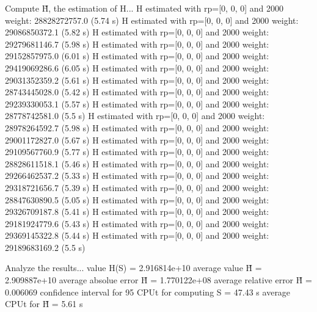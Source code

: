 Compute H̃, the estimation of H...
  H estimated with rp=[0, 0, 0] and 2000 weight:  28828272757.0  (5.74 s)
  H estimated with rp=[0, 0, 0] and 2000 weight:  29086850372.1  (5.82 s)
  H estimated with rp=[0, 0, 0] and 2000 weight:  29279681146.7  (5.98 s)
  H estimated with rp=[0, 0, 0] and 2000 weight:  29152857975.0  (6.01 s)
  H estimated with rp=[0, 0, 0] and 2000 weight:  29419069286.6  (6.05 s)
  H estimated with rp=[0, 0, 0] and 2000 weight:  29031352359.2  (5.61 s)
  H estimated with rp=[0, 0, 0] and 2000 weight:  28743445028.0  (5.42 s)
  H estimated with rp=[0, 0, 0] and 2000 weight:  29239330053.1  (5.57 s)
  H estimated with rp=[0, 0, 0] and 2000 weight:  28778742581.0  (5.5 s)
  H estimated with rp=[0, 0, 0] and 2000 weight:  28978264592.7  (5.98 s)
  H estimated with rp=[0, 0, 0] and 2000 weight:  29001172827.0  (5.67 s)
  H estimated with rp=[0, 0, 0] and 2000 weight:  29109567760.9  (5.77 s)
  H estimated with rp=[0, 0, 0] and 2000 weight:  28828611518.1  (5.46 s)
  H estimated with rp=[0, 0, 0] and 2000 weight:  29266462537.2  (5.33 s)
  H estimated with rp=[0, 0, 0] and 2000 weight:  29318721656.7  (5.39 s)
  H estimated with rp=[0, 0, 0] and 2000 weight:  28847630890.5  (5.05 s)
  H estimated with rp=[0, 0, 0] and 2000 weight:  29326709187.8  (5.41 s)
  H estimated with rp=[0, 0, 0] and 2000 weight:  29181924779.6  (5.43 s)
  H estimated with rp=[0, 0, 0] and 2000 weight:  29369145322.8  (5.44 s)
  H estimated with rp=[0, 0, 0] and 2000 weight:  29189683169.2  (5.5 s)

Analyze the results...
  value H(S)                  = 2.916814e+10 
  average value H̃             = 2.909887e+10 
  average absolue error H̃     = 1.770122e+08 
  average relative error H̃    = 0.006069 
  confidence interval for 95%
  CPUt for computing S         = 47.43 s
  average CPUt for H̃           = 5.61 s

